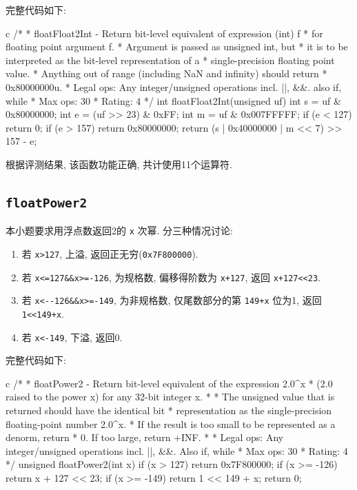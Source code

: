 完整代码如下:

\begin{code}{c}
/*
 * floatFloat2Int - Return bit-level equivalent of expression (int) f
 *   for floating point argument f.
 *   Argument is passed as unsigned int, but
 *   it is to be interpreted as the bit-level representation of a
 *   single-precision floating point value.
 *   Anything out of range (including NaN and infinity) should return
 *   0x80000000u.
 *   Legal ops: Any integer/unsigned operations incl. ||, &&. also if, while
 *   Max ops: 30
 *   Rating: 4
 */
int floatFloat2Int(unsigned uf) {
  int s = uf & 0x80000000;
  int e = (uf >> 23) & 0xFF;
  int m = uf & 0x007FFFFF;
  if (e < 127)
    return 0;
  if (e > 157)
    return 0x80000000;
  return (s | 0x40000000 | m << 7) >> 157 - e;
}
\end{code}

根据评测结果, 该函数功能正确, 共计使用11个运算符.

\subsection{\texttt{floatPower2}}

本小题要求用浮点数返回2的 \verb|x| 次幂. 分三种情况讨论:

\begin{enumerate}[noitemsep]
    \item 若 \verb|x>127|, 上溢, 返回正无穷(\verb|0x7F800000|).
    \item 若 \verb|x<=127&&x>=-126|, 为规格数, 偏移得阶数为 \verb|x+127|, 返回 \verb|x+127<<23|.
    \item 若 \verb|x<--126&&x>=-149|, 为非规格数, 仅尾数部分的第 \verb|149+x| 位为1, 返回 \verb|1<<149+x|.
    \item 若 \verb|x<-149|, 下溢, 返回0.
\end{enumerate}

完整代码如下:

\begin{code}{c}
/*
 * floatPower2 - Return bit-level equivalent of the expression 2.0^x
 *   (2.0 raised to the power x) for any 32-bit integer x.
 *
 *   The unsigned value that is returned should have the identical bit
 *   representation as the single-precision floating-point number 2.0^x.
 *   If the result is too small to be represented as a denorm, return
 *   0. If too large, return +INF.
 *
 *   Legal ops: Any integer/unsigned operations incl. ||, &&. Also if, while
 *   Max ops: 30
 *   Rating: 4
 */
unsigned floatPower2(int x) {
  if (x > 127)
    return 0x7F800000;
  if (x >= -126)
    return x + 127 << 23;
  if (x >= -149)
    return 1 << 149 + x;
  return 0;
}
\end{code}

